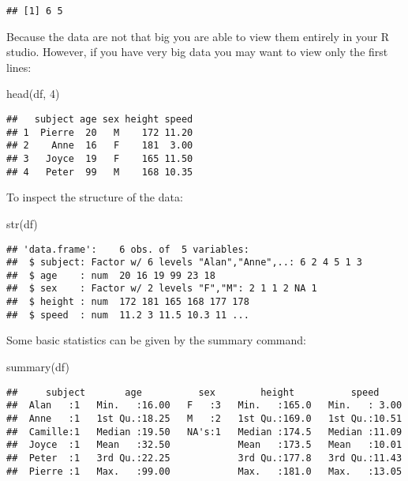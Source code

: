 \documentclass[
]{article}
\newenvironment{Shaded}{\begin{snugshade}}{\end{snugshade}}
\newcommand{\DecValTok}[1]{\textcolor[rgb]{0.00,0.00,0.81}{#1}}
\newcommand{\FunctionTok}[1]{\textcolor[rgb]{0.00,0.00,0.00}{#1}}
\newcommand{\NormalTok}[1]{#1}
\begin{document}
\begin{verbatim}
## [1] 6 5
\end{verbatim}

Because the data are not that big you are able to view them entirely in
your R studio. However, if you have very big data you may want to view
only the first lines:

\begin{Shaded}
\begin{Highlighting}[]
\FunctionTok{head}\NormalTok{(df, }\DecValTok{4}\NormalTok{)}
\end{Highlighting}
\end{Shaded}

\begin{verbatim}
##   subject age sex height speed
## 1  Pierre  20   M    172 11.20
## 2    Anne  16   F    181  3.00
## 3   Joyce  19   F    165 11.50
## 4   Peter  99   M    168 10.35
\end{verbatim}

To inspect the structure of the data:

\begin{Shaded}
\begin{Highlighting}[]
\FunctionTok{str}\NormalTok{(df)}
\end{Highlighting}
\end{Shaded}

\begin{verbatim}
## 'data.frame':    6 obs. of  5 variables:
##  $ subject: Factor w/ 6 levels "Alan","Anne",..: 6 2 4 5 1 3
##  $ age    : num  20 16 19 99 23 18
##  $ sex    : Factor w/ 2 levels "F","M": 2 1 1 2 NA 1
##  $ height : num  172 181 165 168 177 178
##  $ speed  : num  11.2 3 11.5 10.3 11 ...
\end{verbatim}

Some basic statistics can be given by the summary command:

\begin{Shaded}
\begin{Highlighting}[]
\FunctionTok{summary}\NormalTok{(df)}
\end{Highlighting}
\end{Shaded}

\begin{verbatim}
##     subject       age          sex        height          speed      
##  Alan   :1   Min.   :16.00   F   :3   Min.   :165.0   Min.   : 3.00  
##  Anne   :1   1st Qu.:18.25   M   :2   1st Qu.:169.0   1st Qu.:10.51  
##  Camille:1   Median :19.50   NA's:1   Median :174.5   Median :11.09  
##  Joyce  :1   Mean   :32.50            Mean   :173.5   Mean   :10.01  
##  Peter  :1   3rd Qu.:22.25            3rd Qu.:177.8   3rd Qu.:11.43  
##  Pierre :1   Max.   :99.00            Max.   :181.0   Max.   :13.05
\end{verbatim}
\end{document}
